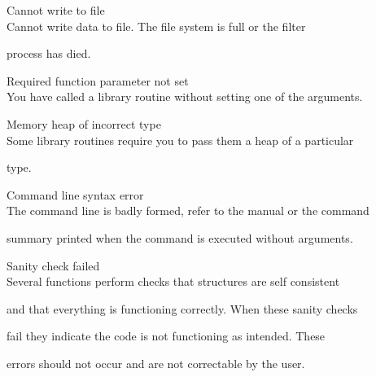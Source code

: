 \begin{itemize}
 Cannot write to file \\


        Cannot write data to file.  The file system is full or the filter


        process has died.





 Required function parameter not set \\


        You have called a library routine without setting one of the arguments.


 Memory heap of incorrect type \\


        Some library routines require you to pass them a heap of a particular


        type.





 Command line syntax error \\


        The command line is badly formed, refer to the manual or the command


        summary printed when the command is executed without arguments.





 Sanity check failed \\


        Several functions perform checks that structures are self consistent


        and that everything is functioning correctly.  When these sanity checks


        fail they indicate the code is not functioning as intended.  These


        errors should not occur and are not correctable by the user.


\end{itemize}










